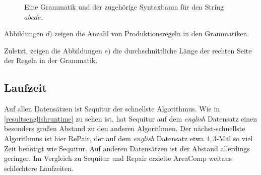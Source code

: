\begin{figure}
    \centering
    \caption{Eine Grammatik und der zugehörige Syntaxbaum für den String $abcde$.}
    \label{syntaxtree}
\end{figure}

Abbildungen $d)$ zeigen die Anzahl von Produktionsregeln in den Grammatiken. 

Zuletzt, zeigen die Abbildungen $e)$ die durchschnittliche Länge der rechten Seite der Regeln in der Grammatik.

\subsection{Laufzeit}

Auf allen Datensätzen ist Sequitur der schnellste Algorithmus. Wie in \autoref{resultsenglishruntime} zu sehen ist, hat Sequitur auf dem \emph{english} Datensatz einen besonders großen Abstand zu den anderen Algorithmen. Der nächst-schnellste Algorithmus ist hier RePair, der auf dem \emph{english} Datensatz etwa $4,3$-Mal so viel Zeit benötigt wie Sequitur. Auf anderen Datensätzen ist der Abstand allerdings geringer.
Im Vergleich zu Sequitur und Repair erzielte AreaComp weitaus schlechtere Laufzeiten.

